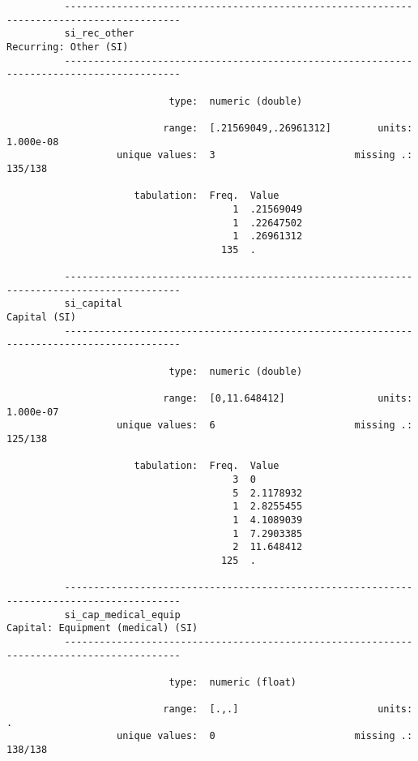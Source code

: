 \documentclass{article}
\begin{document}
\begin{verbatim}
          ------------------------------------------------------------------------------------------
          si_rec_other                                                         Recurring: Other (SI)
          ------------------------------------------------------------------------------------------
          
                            type:  numeric (double)
          
                           range:  [.21569049,.26961312]        units:  1.000e-08
                   unique values:  3                        missing .:  135/138
          
                      tabulation:  Freq.  Value
                                       1  .21569049
                                       1  .22647502
                                       1  .26961312
                                     135  .
          
          ------------------------------------------------------------------------------------------
          si_capital                                                                    Capital (SI)
          ------------------------------------------------------------------------------------------
          
                            type:  numeric (double)
          
                           range:  [0,11.648412]                units:  1.000e-07
                   unique values:  6                        missing .:  125/138
          
                      tabulation:  Freq.  Value
                                       3  0
                                       5  2.1178932
                                       1  2.8255455
                                       1  4.1089039
                                       1  7.2903385
                                       2  11.648412
                                     125  .
          
          ------------------------------------------------------------------------------------------
          si_cap_medical_equip                                     Capital: Equipment (medical) (SI)
          ------------------------------------------------------------------------------------------
          
                            type:  numeric (float)
          
                           range:  [.,.]                        units:  .
                   unique values:  0                        missing .:  138/138
          

\end{verbatim}
\end{document}
